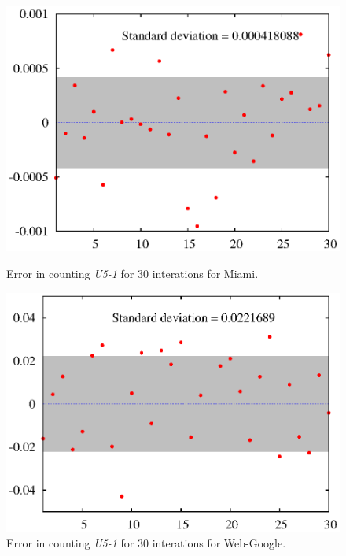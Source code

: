 \begin{figure}[htbp]
\hfill
\begin{minipage}[t]{0.45\linewidth}
\begin{center}
\centerline{\includegraphics[scale=0.33]{plots/harp-30-miami-percent.eps}}
\caption{Error in counting \textit{U5-1} for 30 interations for Miami.}
\label{fig:miami-30-run}
\end{center}
\end{minipage}
\hfill
\begin{minipage}[t]{0.45\linewidth}
\begin{center}
\centerline{\includegraphics[scale=0.33]{plots/harp-30-webgoogle-percent.eps}}
\caption{Error in counting \textit{U5-1} for 30 interations for Web-Google.}
\label{fig:webgoogle-30-run}
\end{center}
\end{minipage}
\hfill
\end{figure}


